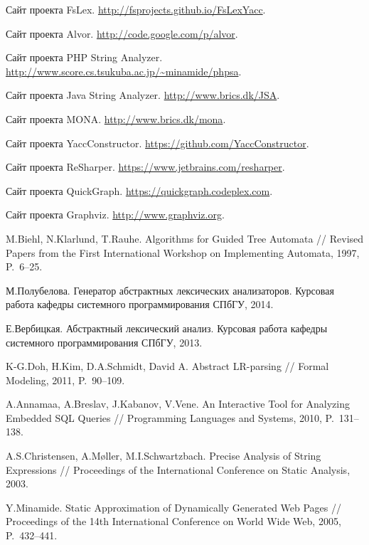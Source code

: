 \begin{thebibliography}{99}
    Сайт проекта FsLex. \url{http://fsprojects.github.io/FsLexYacc}.

    Сайт проекта Alvor. \url{http://code.google.com/p/alvor}.

    Сайт проекта PHP String Analyzer. \url{http://www.score.cs.tsukuba.ac.jp/~minamide/phpsa}.

    Сайт проекта Java String Analyzer. \url{http://www.brics.dk/JSA}.

    Сайт проекта MONA. \url{http://www.brics.dk/mona}.
 
    Сайт проекта YaccConstructor. \url{https://github.com/YaccConstructor}.

    Сайт проекта ReSharper. \url{https://www.jetbrains.com/resharper}.

    Сайт проекта QuickGraph. \url{https://quickgraph.codeplex.com}.

    Сайт проекта Graphviz. \url{http://www.graphviz.org}.

    M.Biehl, N.Klarlund, T.Rauhe.
    Algorithms for Guided Tree Automata // Revised Papers from the First International Workshop on Implementing Automata,
    1997, P.~6--25.

    М.Полубелова. Генератор абстрактных лексических анализаторов.
    Курсовая работа кафедры системного программирования СПбГУ, 2014.

    Е.Вербицкая. Абстрактный лексический анализ.
    Курсовая работа кафедры системного программирования СПбГУ, 2013.

 K-G.Doh, H.Kim, D.A.Schmidt, David A.
 Abstract LR-parsing // Formal Modeling, 2011, P.~90--109.

  A.Annamaa, A.Breslav, J.Kabanov, V.Vene.
  An Interactive Tool for Analyzing Embedded SQL Queries //
  Programming Languages and Systems, 2010, P.~131--138.

 A.S.Christensen, A.M{\o}ller, M.I.Schwartzbach.
 Precise Analysis of String Expressions //
 Proceedings of the International Conference on Static Analysis, 2003.

 Y.Minamide.
 Static Approximation of Dynamically Generated Web Pages //
 Proceedings of the 14th International Conference on World Wide Web, 2005,
 P.~432--441.


\end{thebibliography}
